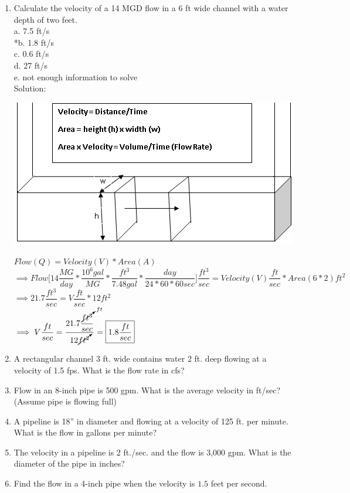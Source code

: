\documentclass{article}
\begin{document}
\begin{enumerate}
\newpage
\item Calculate the velocity of a 14 MGD flow in a 6 ft wide channel with a water depth of two feet.\\
a.	7.5 ft/s\\
*b.	1.8  ft/s\\
c.	0.6 ft/s\\
d.	27 ft/s\\
e.	not enough information to solve\\
Solution:\\
\begin{center}
\includegraphics[scale=0.5]{ChannelFlow3}
\end{center}
$Flow (Q) = Velocity (V) * Area (A)$\\
$\implies Flow\Big[ 14 \dfrac{MG}{day}* \dfrac{10^6 gal}{MG} * \dfrac{ft^3}{7.48 gal}*\dfrac{day}{24*60*60sec}\Big]\dfrac{ft^3}{sec} = Velocity(V) \dfrac{ft}{sec}* Area (6 * 2) ft ^2$\\
\vspace{0.2cm}
$\implies 21.7 \dfrac{ft^3}{sec}= V\dfrac{ft}{sec}*12ft^2$\\
$\implies V \dfrac{ft}{sec}= \dfrac{21.7\dfrac{\cancelto{ft}{ft^3}}{sec}}{12\cancelto{}{ft^2}}= \boxed{1.8\dfrac{ft}{sec}}$\\

\item A rectangular channel 3 ft. wide contains water 2 ft. deep flowing at a velocity of 1.5 fps.
What is the flow rate in cfs?

\item Flow in an 8-inch pipe is 500 gpm. What is the average velocity in ft/sec? (Assume pipe is flowing full)

\item A pipeline is 18” in diameter and flowing at a velocity of 125 ft. per minute. What is the flow in gallons per minute?

\item The velocity in a pipeline is 2 ft./sec. and the flow is 3,000 gpm. What is the diameter of the pipe in inches?



\item Find the flow in a 4-inch pipe when the velocity is $1.5$ feet per second.


\end{enumerate}
\end{document}
